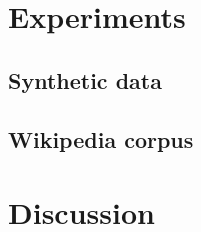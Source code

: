 \documentclass{article}
\begin{document}
\section{Experiments}

\subsection{Synthetic data}

\subsection{Wikipedia corpus}

\section{Discussion}

\cite{langley00}



\end{document}
